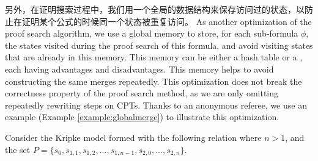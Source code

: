 另外，在证明搜索过程中，我们用一个全局的数据结构来保存访问过的状态，以防止在证明某个公式的时候同一个状态被重复访问。
As another optimization of the proof search algorithm, we use a global memory to store, for each sub-formula $\phi$, 
the states visited during the proof search of this formula, and avoid visiting states that are already in this memory. 
This memory can be either a hash table or a \BDD{}, each having 
advantages and disadvantages. 
This memory helps to avoid constructing the same merges
repeatedly. This optimization does not break the correctness
property of the proof search method, as we are only omitting
repeatedly rewriting steps on \textsf{CPT}s. Thanks to an anonymous referee, we use an example (Example \ref{example:globalmerge}) to illustrate this optimization.
{\color{blue}
	\begin{example}\label{example:globalmerge}
		Consider the Kripke model formed with the following relation where $n>1$, and the set $P=\{s_0,s_{1,1},s_{1,2},...,s_{1,n-1},s_{2,0},...,s_{2,n}\}$. 
		\begin{center}
			\centering
\end{center}
\end{example}}
